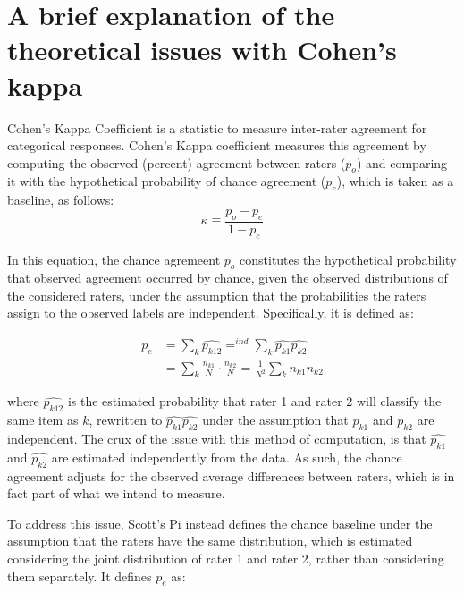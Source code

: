 \section{A brief explanation of the theoretical issues with Cohen's kappa}\label{app:cohenslimitation}

Cohen's Kappa Coefficient \citep{cohen1960kappa} is a statistic to measure inter-rater agreement for categorical responses.
Cohen's Kappa coefficient measures this agreement by computing the observed (percent) agreement between raters ($p_o$) and comparing it with the hypothetical probability of chance agreement ($p_e$), which is taken as a baseline, as follows:
\begin{equation}
\kappa \equiv \frac{p_o - p_e}{1 - p_e}
\end{equation}

In this equation, the chance agremeent $p_o$ constitutes the hypothetical probability that observed agreement occurred by chance, given the observed distributions of the considered raters, under the assumption that the probabilities the raters assign to the observed labels are independent.
Specifically, it is defined as:

\begin{equation*}
\begin{aligned}
p_e &= \sum_k \widehat{p_{k12}} =^{ind} \sum_k \widehat{p_{k1}} \widehat{p_{k2}} \\
    &= \sum_k \frac{n_{k1}}{N} \cdot \frac{n_{k2}}{N}
     = \frac{1}{N^2} \sum_k n_{k1} n_{k2}
\end{aligned}
\end{equation*}

where $\widehat{p_{k12}}$ is the estimated probability that rater 1 and rater 2 will classify the same item as $k$, rewritten to $\widehat{p_{k1}}\widehat{p_{k2}}$ under the assumption that $p_{k1}$ and $p_{k2}$ are independent.
The crux of the issue with this method of computation, is that $\widehat{p_{k1}}$ and $\widehat{p_{k2}}$ are estimated independently from the data.
As such, the chance agreement adjusts for the observed average differences between raters, which is in fact part of what we intend to measure.

To address this issue, Scott's Pi \citep{scott1995scottspi} instead defines the chance baseline under the assumption that the raters have the same distribution, which is estimated considering the joint distribution of rater 1 and rater 2, rather than considering them separately.
It defines $p_e$ as:

